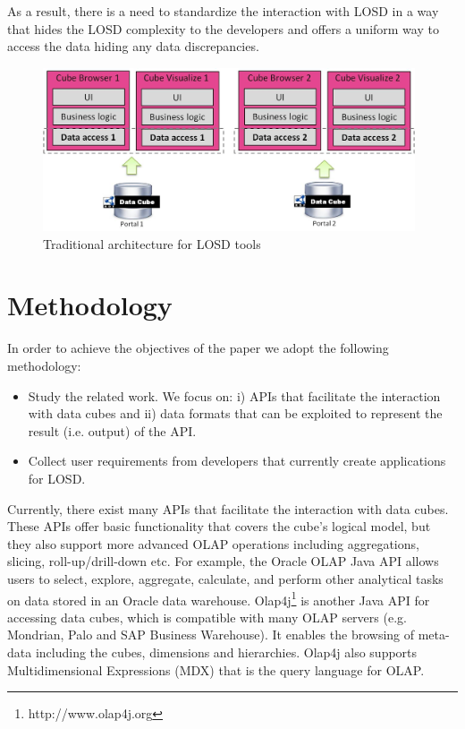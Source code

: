 \documentclass{llncs}
\begin{document}
As a result, there is a need to standardize the interaction with LOSD in a way that hides the LOSD complexity to the developers and offers a uniform way to access the data hiding any data discrepancies. 

\begin{figure}
\begin{center}
  \includegraphics[width=110mm]{images/asis.jpg}
  \end{center}
\caption{Traditional architecture for LOSD tools}
\label{fig:asis}
\end{figure}

\section{Methodology}\label{sec:methodology}

In order to achieve the objectives of the paper we adopt the following methodology:
\begin{itemize}
\item Study the related work. We focus on: i) APIs that facilitate the interaction with data cubes and ii) data formats that can be exploited to represent the result (i.e. output) of the API. 
\item Collect user requirements from developers that currently create applications for LOSD. 
\end{itemize}

Currently, there exist many APIs that facilitate the interaction with data cubes. These APIs offer basic functionality that covers the cube's logical model, but they also support more advanced OLAP operations including aggregations, slicing, roll-up/drill-down etc. For example, the Oracle OLAP Java API \cite{ORACLEAPI} allows users to select, explore, aggregate, calculate, and perform other analytical tasks on data stored in an Oracle data warehouse. Olap4j\footnote{http://www.olap4j.org} is another Java API for accessing data cubes, which is compatible with many OLAP servers (e.g. Mondrian, Palo and SAP Business Warehouse). It enables the browsing of meta-data including the cubes, dimensions and  hierarchies. Olap4j also supports Multidimensional Expressions (MDX) that is the query language for OLAP.
\end{document}
